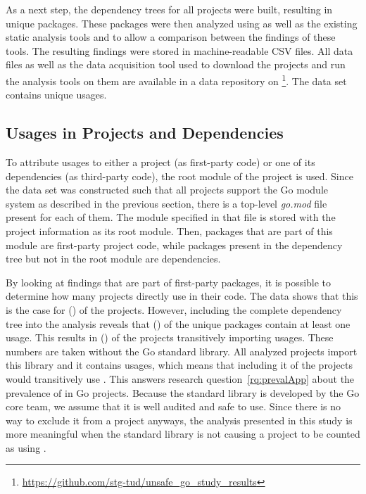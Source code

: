 As a next step, the dependency trees for all projects were built, resulting in \packagesAnalyzed{} unique packages.
These packages were then analyzed using \toolGeiger{} as well as the existing static analysis tools \toolVet{} and
\toolGosec{} to allow a comparison between the findings of these tools.
The resulting findings were stored in machine-readable \acrshort{CSV} files.
All data files as well as the data acquisition tool used to download the projects and run the analysis tools on them
are available in a data repository on \github{}\footnote{\url{https://github.com/stg-tud/unsafe_go_study_results}}.
The data set contains \uniqueUnsafeFindings unique \unsafe{} usages.



\subsection{Usages in Projects and Dependencies}\label{subsec:go-geiger:evaluation:unsafe-usage}

To attribute \unsafe{} usages to either a project (as first-party code) or one of its dependencies (as third-party
code), the root module of the project is used.
Since the data set was constructed such that all projects support the Go module system as described in the previous
section, there is a top-level \textit{go.mod} file present for each of them.
The module specified in that file is stored with the project information as its root module.
Then, packages that are part of this module are first-party project code, while packages present in the dependency tree
but not in the root module are dependencies.

By looking at \unsafe{} findings that are part of first-party packages, it is possible to determine how many projects
directly use \unsafe{} in their code.
The data shows that this is the case for \unsafeProjects{} (\percentageUnsafeProjects{}) of the \projsAnalyzed{}
projects.
However, including the complete dependency tree into the analysis reveals that \unsafePackages{}
(\percentageUnsafePackages{}) of the \packagesAnalyzed{} unique packages contain at least one \unsafe{} usage.
This results in \unsafeTransitiveWithDependencies{} (\percentageUnsafeTransitiveWithDependencies{}) of the projects
transitively importing \unsafe{} usages.
These numbers are taken without the Go standard library.
All analyzed projects import this library and it contains \unsafe{} usages, which means that including it
 of the projects would transitively use \unsafe{}.
This answers research question~\ref{rq:prevalApp} about the prevalence of \unsafe{} in Go projects.
Because the standard library is developed by the Go core team, we assume that it is well audited and safe to use.
Since there is no way to exclude it from a project anyways, the analysis presented in this study is more meaningful
when the standard library is not causing a project to be counted as using \unsafe{}.

